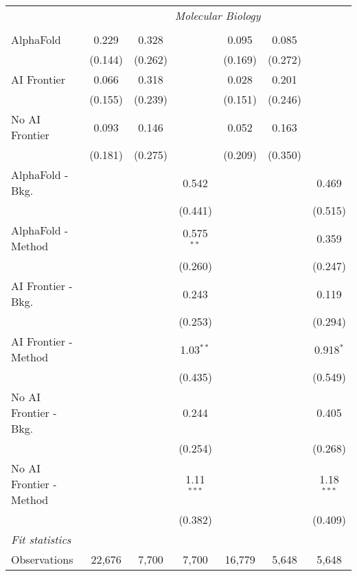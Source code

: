 \begin{tabular}{lcccccc}
 & \multicolumn{6}{c}{\textit{Molecular Biology}} \\ \\
   AlphaFold               & 0.229   & 0.328   &              & 0.095   & 0.085   &   \\   
                           & (0.144) & (0.262) &              & (0.169) & (0.272) &   \\   
   AI Frontier             & 0.066   & 0.318   &              & 0.028   & 0.201   &   \\   
                           & (0.155) & (0.239) &              & (0.151) & (0.246) &   \\   
   No AI Frontier          & 0.093   & 0.146   &              & 0.052   & 0.163   &   \\   
                           & (0.181) & (0.275) &              & (0.209) & (0.350) &   \\   
   AlphaFold - Bkg.        &         &         & 0.542        &         &         & 0.469\\   
                           &         &         & (0.441)      &         &         & (0.515)\\   
   AlphaFold - Method      &         &         & 0.575$^{**}$ &         &         & 0.359\\   
                           &         &         & (0.260)      &         &         & (0.247)\\   
   AI Frontier - Bkg.      &         &         & 0.243        &         &         & 0.119\\   
                           &         &         & (0.253)      &         &         & (0.294)\\   
   AI Frontier - Method    &         &         & 1.03$^{**}$  &         &         & 0.918$^{*}$\\   
                           &         &         & (0.435)      &         &         & (0.549)\\   
   No AI Frontier - Bkg.   &         &         & 0.244        &         &         & 0.405\\   
                           &         &         & (0.254)      &         &         & (0.268)\\   
   No AI Frontier - Method &         &         & 1.11$^{***}$ &         &         & 1.18$^{***}$\\   
                           &         &         & (0.382)      &         &         & (0.409)\\   
   \midrule
   \emph{Fit statistics}\\
   Observations            & 22,676  & 7,700   & 7,700        & 16,779  & 5,648   & 5,648\\  
   

\end{tabular}

